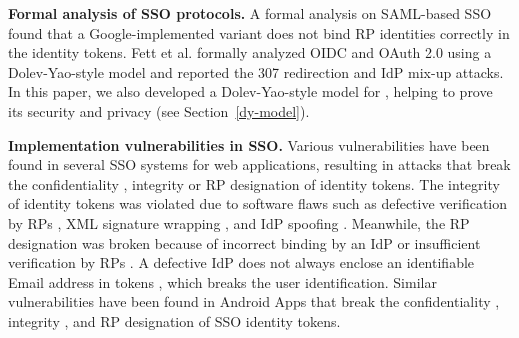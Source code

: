 
\noindent\textbf{Formal analysis of SSO protocols.}
A formal analysis on SAML-based SSO \cite{ArmandoCCCT08} found that a Google-implemented variant does not bind RP identities correctly in the identity tokens.
Fett et al. \cite{FettKS16, FettKS17} formally analyzed OIDC and OAuth 2.0 using a Dolev-Yao-style model \cite{FettKS14} and reported the 307 redirection and IdP mix-up attacks.
In this paper, we also developed a Dolev-Yao-style model for \usso, helping to prove its security and privacy (see Section~\ref{dy-model}).


\noindent\textbf{Implementation vulnerabilities in SSO.}
Various vulnerabilities have been found in several SSO systems for web applications, resulting in attacks %
that break the confidentiality \cite{WangCW12,ccsSunB12,ArmandoCCCPS13,DiscoveringJCS,dimvaLiM16}, integrity \cite{WangCW12,SomorovskyMSKJ12,WangZLG16,MainkaMS16, MainkaMSW17,dimvaLiM16} or RP designation \cite{WangZLG16,MainkaMS16,MainkaMSW17,YangLCZ18,dimvaLiM16} of identity tokens.
The integrity of identity tokens was violated %
due to software flaws such as defective verification by RPs \cite{WangCW12,WangZLG16,MainkaMSW17}, XML signature wrapping \cite{SomorovskyMSKJ12}, and IdP spoofing \cite{MainkaMS16,MainkaMSW17}.
Meanwhile, the RP designation was broken because of incorrect binding by an IdP \cite{YangLCZ18,WangZLG16} or insufficient verification by RPs \cite{MainkaMS16,MainkaMSW17,YangLCZ18}.
A defective IdP does not always enclose an identifiable Email address in tokens \cite{WangCW12},
 which breaks the user identification.
Similar vulnerabilities have been found in Android Apps that break the confidentiality \cite{ChenPCTKT14,WangZLLYLG15,YangLS17,ShiWL19}, integrity \cite{ChenPCTKT14,YangLS17}, and RP designation \cite{ChenPCTKT14,ShiWL19,WangZLLYLG15} of SSO identity tokens.

